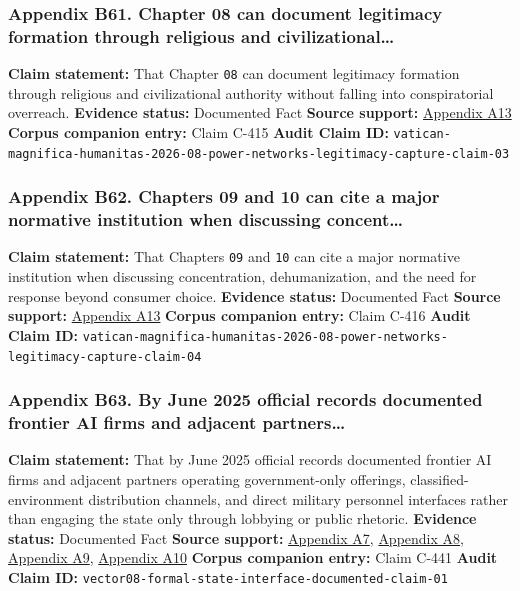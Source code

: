 \documentclass[
  american,
  11pt,
  letterpaper,
]{article}
\begin{document}
\subsubsection{Appendix B61. Chapter 08 can document legitimacy
formation through religious and
civilizational\ldots{}}\label{appendix-b61-chapter-08-can-document-legitimacy-formation-through-religious-and-civilizational}

\textbf{Claim statement:} That Chapter \texttt{08} can document
legitimacy formation through religious and civilizational authority
without falling into conspiratorial overreach. \textbf{Evidence status:}
Documented Fact \textbf{Source support:}
\hyperref[appendix-a13-encyclical-letter-of-his-holiness-leo-xiv-magnifica-humanitas]{Appendix
A13} \textbf{Corpus companion entry:} Claim C-415 \textbf{Audit Claim
ID:}
\texttt{vatican-magnifica-humanitas-2026-08-power-networks-legitimacy-capture-claim-03}

\subsubsection{Appendix B62. Chapters 09 and 10 can cite a major
normative institution when discussing
concent\ldots{}}\label{appendix-b62-chapters-09-and-10-can-cite-a-major-normative-institution-when-discussing-concent}

\textbf{Claim statement:} That Chapters \texttt{09} and \texttt{10} can
cite a major normative institution when discussing concentration,
dehumanization, and the need for response beyond consumer choice.
\textbf{Evidence status:} Documented Fact \textbf{Source support:}
\hyperref[appendix-a13-encyclical-letter-of-his-holiness-leo-xiv-magnifica-humanitas]{Appendix
A13} \textbf{Corpus companion entry:} Claim C-416 \textbf{Audit Claim
ID:}
\texttt{vatican-magnifica-humanitas-2026-08-power-networks-legitimacy-capture-claim-04}

\subsubsection{Appendix B63. By June 2025 official records documented
frontier AI firms and adjacent
partners\ldots{}}\label{appendix-b63-by-june-2025-official-records-documented-frontier-ai-firms-and-adjacent-partners}

\textbf{Claim statement:} That by June 2025 official records documented
frontier AI firms and adjacent partners operating government-only
offerings, classified-environment distribution channels, and direct
military personnel interfaces rather than engaging the state only
through lobbying or public rhetoric. \textbf{Evidence status:}
Documented Fact \textbf{Source support:}
\hyperref[appendix-a7-introducing-openai-for-government]{Appendix A7},
\hyperref[appendix-a8-claude-gov-models-for-u-s-national-security-customers]{Appendix
A8},
\hyperref[appendix-a9-anthropic-and-palantir-partner-to-bring-claude-ai-models-to-aws-for-u-s-government-intelligence-and-defense-operations]{Appendix
A9},
\hyperref[appendix-a10-army-launches-detachment-201-executive-innovation-corps-to-drive-tech-transformation]{Appendix
A10} \textbf{Corpus companion entry:} Claim C-441 \textbf{Audit Claim
ID:} \texttt{vector08-formal-state-interface-documented-claim-01}
\end{document}
